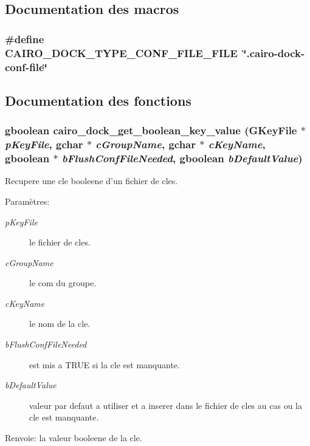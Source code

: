 \subsection{Documentation des macros}
\subsubsection{\setlength{\rightskip}{0pt plus 5cm}\#define CAIRO\_\-DOCK\_\-TYPE\_\-CONF\_\-FILE\_\-FILE~\char`\"{}.cairo-dock-conf-file\char`\"{}}\label{cairo-dock-config_8c_188502d7a7cf14a71adb7060000f14ed}




\subsection{Documentation des fonctions}
\subsubsection{\setlength{\rightskip}{0pt plus 5cm}gboolean cairo\_\-dock\_\-get\_\-boolean\_\-key\_\-value (GKey\-File $\ast$ {\em p\-Key\-File}, gchar $\ast$ {\em c\-Group\-Name}, gchar $\ast$ {\em c\-Key\-Name}, gboolean $\ast$ {\em b\-Flush\-Conf\-File\-Needed}, gboolean {\em b\-Default\-Value})}\label{cairo-dock-config_8c_c5270550536ee2b141bb837ed3109f7b}


Recupere une cle booleene d'un fichier de cles. \begin{Desc}
\item[Param\`{e}tres:]
\begin{description}
\item[{\em p\-Key\-File}]le fichier de cles. \item[{\em c\-Group\-Name}]le com du groupe. \item[{\em c\-Key\-Name}]le nom de la cle. \item[{\em b\-Flush\-Conf\-File\-Needed}]est mis a TRUE si la cle est manquante. \item[{\em b\-Default\-Value}]valeur par defaut a utiliser et a inserer dans le fichier de cles au cas ou la cle est manquante. \end{description}
\end{Desc}
\begin{Desc}
\item[Renvoie:]la valeur booleene de la cle. \end{Desc}

